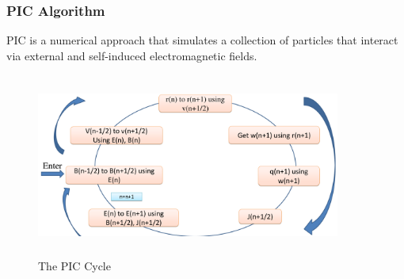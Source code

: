 \documentclass{beamer}
\begin{document}
\begin{frame}
    \small
    \frametitle{PIC Algorithm}
    PIC is a numerical approach that simulates a collection of particles that interact via external and self-induced electromagnetic fields.\cite{suciu}
    \begin{figure}
        \includegraphics[width=10cm, height=6cm]{PIC.png}
        \centering
        \caption{The PIC Cycle}
    \end{figure}

\end{frame}
\end{document}
